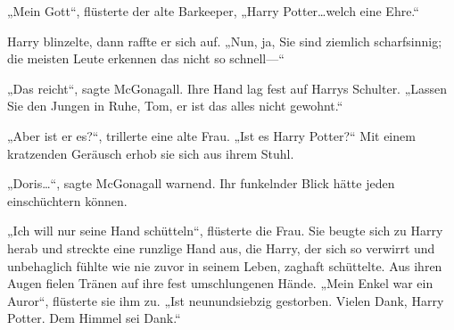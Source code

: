 „Mein Gott“, flüsterte der alte Barkeeper, „Harry Potter…welch eine Ehre.“

Harry blinzelte, dann raffte er sich auf. „Nun, ja, Sie sind ziemlich scharfsinnig; die meisten Leute erkennen das nicht so schnell—“

„Das reicht“, sagte McGonagall. Ihre Hand lag fest auf Harrys Schulter. „Lassen Sie den Jungen in Ruhe, Tom, er ist das alles nicht gewohnt.“

„Aber ist er es?“, trillerte eine alte Frau. „Ist es Harry Potter?“ Mit einem kratzenden Geräusch erhob sie sich aus ihrem Stuhl.

„Doris…“, sagte McGonagall warnend. Ihr funkelnder Blick hätte jeden einschüchtern können.

„Ich will nur seine Hand schütteln“, flüsterte die Frau. Sie beugte sich zu Harry herab und streckte eine runzlige Hand aus, die Harry, der sich so verwirrt und unbehaglich fühlte wie nie zuvor in seinem Leben, zaghaft schüttelte. Aus ihren Augen fielen Tränen auf ihre fest umschlungenen Hände. „Mein Enkel war ein Auror“, flüsterte sie ihm zu. „Ist neunundsiebzig gestorben. Vielen Dank, Harry Potter. Dem Himmel sei Dank.“

